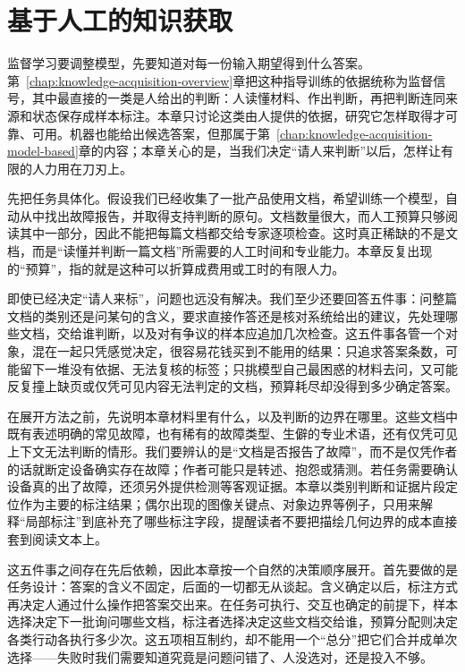 \chapter{基于人工的知识获取}
\label{chap:knowledge-acquisition-human}

监督学习要调整模型，先要知道对每一份输入期望得到什么答案。第~\ref{chap:knowledge-acquisition-overview}章把这种指导训练的依据统称为监督信号，其中最直接的一类是人给出的判断：人读懂材料、作出判断，再把判断连同来源和状态保存成样本标注。本章只讨论这类由人提供的依据，研究它怎样取得才可靠、可用。机器也能给出候选答案，但那属于第~\ref{chap:knowledge-acquisition-model-based}章的内容；本章关心的是，当我们决定“请人来判断”以后，怎样让有限的人力用在刀刃上。

先把任务具体化。假设我们已经收集了一批产品使用文档，希望训练一个模型，自动从中找出故障报告，并取得支持判断的原句。文档数量很大，而人工预算只够阅读其中一部分，因此不能把每篇文档都交给专家逐项检查。这时真正稀缺的不是文档，而是“读懂并判断一篇文档”所需要的人工时间和专业能力。本章反复出现的“预算”，指的就是这种可以折算成费用或工时的有限人力。

即使已经决定“请人来标”，问题也远没有解决。我们至少还要回答五件事：问整篇文档的类别还是问某句的含义，要求直接作答还是核对系统给出的建议，先处理哪些文档，交给谁判断，以及对有争议的样本应追加几次检查。这五件事各管一个对象，混在一起只凭感觉决定，很容易花钱买到不能用的结果：只追求答案条数，可能留下一堆没有依据、无法复核的标签；只挑模型自己最困惑的材料去问，又可能反复撞上缺页或仅凭可见内容无法判定的文档，预算耗尽却没得到多少确定答案。

在展开方法之前，先说明本章材料里有什么，以及判断的边界在哪里。这些文档中既有表述明确的常见故障，也有稀有的故障类型、生僻的专业术语，还有仅凭可见上下文无法判断的情形。我们要辨认的是“文档是否报告了故障”，而不是仅凭作者的话就断定设备确实存在故障；作者可能只是转述、抱怨或猜测。若任务需要确认设备真的出了故障，还须另外提供检测等客观证据。本章以类别判断和证据片段定位作为主要的标注结果；偶尔出现的图像关键点、对象边界等例子，只用来解释“局部标注”到底补充了哪些标注字段，提醒读者不要把描绘几何边界的成本直接套到阅读文本上。

这五件事之间存在先后依赖，因此本章按一个自然的决策顺序展开。首先要做的是任务设计：答案的含义不固定，后面的一切都无从谈起。含义确定以后，标注方式再决定人通过什么操作把答案交出来。在任务可执行、交互也确定的前提下，样本选择决定下一批询问哪些文档，标注者选择决定这些文档交给谁，预算分配则决定各类行动各执行多少次。这五项相互制约，却不能用一个“总分”把它们合并成单次选择——失败时我们需要知道究竟是问题问错了、人没选对，还是投入不够。

